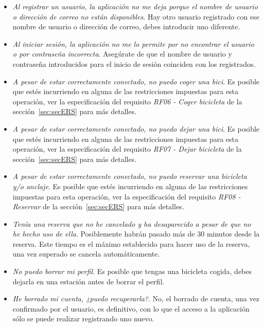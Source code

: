 \begin{itemize}
	\item \textit{Al registrar un usuario, la aplicación no me deja porque el nombre de usuario o dirección de correo no están disponibles}. Hay otro usuario registrado con ese nombre de usuario o dirección de correo, debes introducir uno diferente.
	
	\item \textit{Al iniciar sesión, la aplicación no me lo permite por no encontrar el usuario o por contraseña incorrecta}. Asegúrate de que el nombre de usuario y contraseña introducidos para el inicio de sesión coinciden con los registrados.
	
	\item \textit{A pesar de estar correctamente conectado, no puedo coger una bici}. Es posible que estés incurriendo en alguna de las restricciones impuestas para esta operación, ver la especificación del requisito \emph{RF06 - Coger bicicleta} de la sección~\ref{sec:secERS} para más detalles.
	
	\item \textit{A pesar de estar correctamente conectado, no puedo dejar una bici}. Es posible que estés incurriendo en alguna de las restricciones impuestas para esta operación, ver la especificación del requisito \emph{RF07 - Dejar bicicleta} de la sección~\ref{sec:secERS} para más detalles.
	
	\item \textit{A pesar de estar correctamente conectado, no puedo reservar una bicicleta y/o anclaje}. Es posible que estés incurriendo en alguna de las restricciones impuestas para esta operación, ver la especificación del requisito \emph{RF08 - Reservar} de la sección~\ref{sec:secERS} para más detalles.
	
	\item \textit{Tenía una reserva que no he cancelado y ha desaparecido a pesar de que no he hecho uso de ella}. Posiblemente habrán pasado más de 30 minutos desde la reserva. Este tiempo es el máximo establecido para hacer uso de la reserva, una vez superado se cancela automáticamente.
	
	\item \textit{No puedo borrar mi perfil}. Es posible que tengas una bicicleta cogida, debes dejarla en una estación antes de borrar el perfil.
	
	\item \textit{He borrado mi cuenta, ¿puedo recuperarla?}. No, el borrado de cuenta, una vez confirmado por el usuario, es definitivo, con lo que el acceso a la aplicación sólo se puede realizar registrando uno nuevo.
	
\end{itemize}

